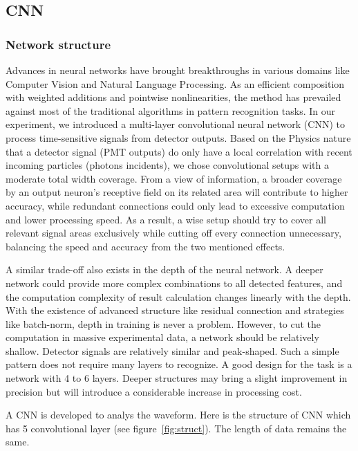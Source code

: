 \subsection{CNN}

\subsubsection{Network structure}

Advances in neural networks have brought breakthroughs in various domains like Computer Vision and Natural Language Processing. As an efficient composition with weighted additions and pointwise nonlinearities, the method has prevailed against most of the traditional algorithms in pattern recognition tasks. In our experiment, we introduced a multi-layer convolutional neural network (CNN) to process time-sensitive signals from detector outputs. Based on the Physics nature that a detector signal (PMT outputs) do only have a local correlation with recent incoming particles (photons incidents), we chose convolutional setups with a moderate total width coverage. From a view of information, a broader coverage by an output neuron's receptive field on its related area will contribute to higher accuracy, while redundant connections could only lead to excessive computation and lower processing speed. As a result, a wise setup should try to cover all relevant signal areas exclusively while cutting off every connection unnecessary, balancing the speed and accuracy from the two mentioned effects.

A similar trade-off also exists in the depth of the neural network. A deeper network could provide more complex combinations to all detected features, and the computation complexity of result calculation changes linearly with the depth. With the existence of advanced structure like residual connection and strategies like batch-norm, depth in training is never a problem. However, to cut the computation in massive experimental data, a network should be relatively shallow. Detector signals are relatively similar and peak-shaped. Such a simple pattern does not require many layers to recognize. A good design for the task is a network with 4 to 6 layers. Deeper structures may bring a slight improvement in precision but will introduce a considerable increase in processing cost.

A CNN is developed to analys the waveform. Here is the structure of CNN which has 5 convolutional layer (see figure~\ref{fig:struct}). The length of data remains the same. 

